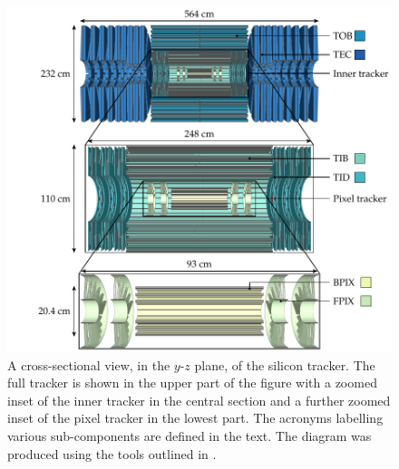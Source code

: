 \begin{figure}[htb]
    \centering
    \includegraphics[]{diagrams/tikz/cms/annotated/cms_tracker.pdf}
    \caption[Cross-section view of the silicon tracker.]{
        A cross-sectional view, in the $y$-$z$ plane, of the silicon tracker.  The full tracker is shown in the upper part of the figure with a zoomed inset of the inner tracker in the central section and a further zoomed inset of the pixel tracker in the lowest part. The acronyms labelling various sub-components are defined in the text. The diagram was produced using the tools outlined in \cite{Sakuma:2013jqa}.
    }
    \label{fig:cms-tracker}
\end{figure}

